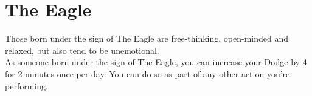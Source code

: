\section{The Eagle}

Those born under the sign of The Eagle are free-thinking, open-minded and relaxed, but also tend to be unemotional.\\
As someone born under the sign of The Eagle, you can increase your Dodge by 4 for 2 minutes once per day. You can do so as part of any other action you're performing.\\